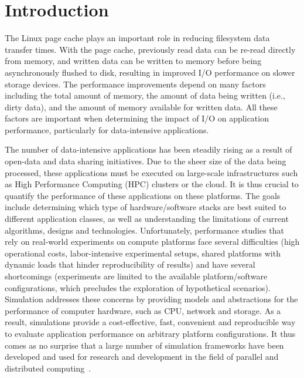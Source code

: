 \documentclass[conference]{IEEEtran}
\begin{document}
    \section{Introduction}

        The Linux page cache plays an important role in
        reducing filesystem data transfer times. With the page cache, previously
        read data can be re-read directly from memory, and written data can be written to
        memory before being asynchronously flushed to disk, resulting in improved I/O performance
        on slower storage devices. The performance improvements
        depend on many factors including the total amount of memory,
        the amount of data being written (i.e., dirty data), and the amount of memory available for
        written data. All these factors are important when determining the impact of I/O on
        application performance, particularly for data-intensive applications.

        The number of data-intensive applications has been steadily rising as a result of
        open-data and data sharing initiatives. Due to the sheer size of the data being
        processed, these applications must be executed on large-scale infrastructures
    such as High Performance Computing (HPC) clusters or the cloud.  It
    is thus crucial to quantify the performance of these applications
    on these platforms. The goals include determining which type of hardware/software
    stacks are best suited to different application classes, as well as
    understanding the limitations of current algorithms, designs and
    technologies. Unfortunately, performance
        studies that rely on real-world experiments on compute platforms
        face several difficulties (high operational costs, labor-intensive experimental setups,
        shared platforms with dynamic loads that hinder reproducibility of results) and have several shortcomings
        (experiments are limited to the available platform/software configurations, which precludes
        the exploration of hypothetical scenarios). 
    Simulation addresses these concerns by providing models
    and abstractions for the performance of computer hardware, such as
    CPU, network and storage. As a result, simulations provide a
    cost-effective, fast, convenient and reproducible way to evaluate
    application performance on arbitrary platform configurations. It thus comes
        as no surprise that a large number of simulation frameworks have been developed and used 
        for research and development in the field of parallel and distributed computing~\cite{ optorsim, gridsim, groudsim, cloudsim, nunez2012simcan,nunez2012icancloud, mdcsim, dissect_cf, cloudnetsimplusplus, fognetsimplusplus, casanova2014simgrid, ROSS, casanova2020fgcs}. 
\end{document}
